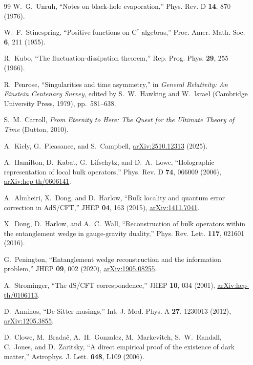 \documentclass[aps,prd,twocolumn,superscriptaddress,nofootinbib]{revtex4-2}
\begin{document}
\begin{thebibliography}{99}
 W.~G.~Unruh, ``Notes on black-hole evaporation,'' Phys. Rev. D \textbf{14}, 870 (1976).

 W.~F.~Stinespring, ``Positive functions on C$^*$-algebras,'' Proc. Amer. Math. Soc. \textbf{6}, 211 (1955).

 R.~Kubo, ``The fluctuation-dissipation theorem,'' Rep. Prog. Phys. \textbf{29}, 255 (1966).

 R.~Penrose, ``Singularities and time asymmetry,'' in \emph{General Relativity: An Einstein Centenary Survey}, edited by S.~W.~Hawking and W.~Israel (Cambridge University Press, 1979), pp.~581--638.

 S.~M.~Carroll, \emph{From Eternity to Here: The Quest for the Ultimate Theory of Time} (Dutton, 2010).

 A.~Kiely, G.~Pleasance, and S.~Campbell, \href{https://arxiv.org/abs/2510.12313}{arXiv:2510.12313} (2025).

 A.~Hamilton, D.~Kabat, G.~Lifschytz, and D.~A.~Lowe, ``Holographic representation of local bulk operators,'' Phys. Rev. D \textbf{74}, 066009 (2006), \href{https://arxiv.org/abs/hep-th/0606141}{arXiv:hep-th/0606141}.

 A.~Almheiri, X.~Dong, and D.~Harlow, ``Bulk locality and quantum error correction in AdS/CFT,'' JHEP \textbf{04}, 163 (2015), \href{https://arxiv.org/abs/1411.7041}{arXiv:1411.7041}.

 X.~Dong, D.~Harlow, and A.~C.~Wall, ``Reconstruction of bulk operators within the entanglement wedge in gauge-gravity duality,'' Phys. Rev. Lett. \textbf{117}, 021601 (2016).

 G.~Penington, ``Entanglement wedge reconstruction and the information problem,'' JHEP \textbf{09}, 002 (2020), \href{https://arxiv.org/abs/1905.08255}{arXiv:1905.08255}.

 A.~Strominger, ``The dS/CFT correspondence,'' JHEP \textbf{10}, 034 (2001), \href{https://arxiv.org/abs/hep-th/0106113}{arXiv:hep-th/0106113}.

 D.~Anninos, ``De Sitter musings,'' Int. J. Mod. Phys. A \textbf{27}, 1230013 (2012), \href{https://arxiv.org/abs/1205.3855}{arXiv:1205.3855}.

 D.~Clowe, M.~Brada\v{c}, A.~H.~Gonzalez, M.~Markevitch, S.~W.~Randall, C.~Jones, and D.~Zaritsky, ``A direct empirical proof of the existence of dark matter,'' Astrophys. J. Lett. \textbf{648}, L109 (2006).


\end{thebibliography}
\end{document}
